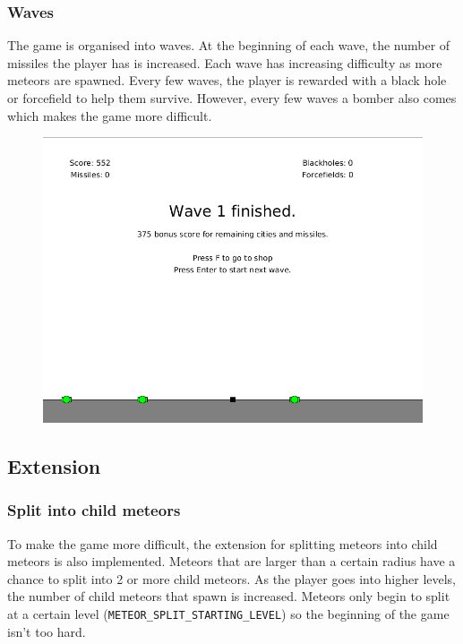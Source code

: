 \documentclass{article}
\begin{document}
\subsubsection*{Waves}
The game is organised into waves. At the beginning of each wave, the number of missiles the player has is increased. Each wave has increasing difficulty as more meteors are spawned. Every few waves, the player is rewarded with a black hole or forcefield to help them survive. However, every few waves a bomber also comes which makes the game more difficult.
\begin{figure}[H]
\centering
\includegraphics[width=1\textwidth, keepaspectratio]{imgs/WaveFinished.png}
\end{figure}


\subsection{Extension}

\subsubsection*{Split into child meteors}
To make the game more difficult, the extension for splitting meteors into child meteors is also implemented. Meteors that are larger than a certain radius have a chance to split into 2 or more child meteors. As the player goes into higher levels, the number of child meteors that spawn is increased. Meteors only begin to split at a certain level (\texttt{METEOR\_SPLIT\_STARTING\_LEVEL}) so the beginning of the game isn't too hard. 
\end{document}

